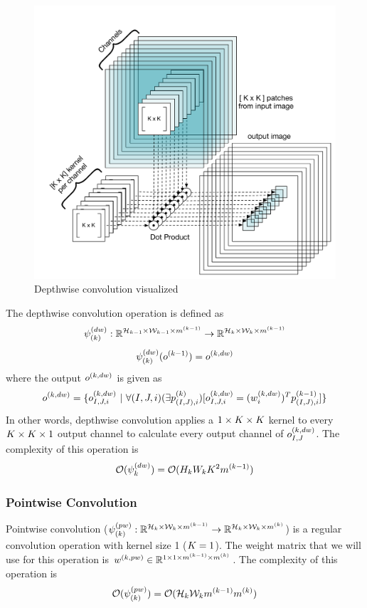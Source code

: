 \begin{figure}[!h]
\vspace{-30px}
  \includegraphics[width=1\textwidth]{images/depthwise.pdf}
  \caption{Depthwise convolution visualized}
  \label{fig:depthwise_conv}
\end{figure}

The depthwise convolution operation is defined as
$$ \psi_{(k)}^{(dw)} : \mathbb{R}^{\mathcal{H}_{k-1} \times \mathcal{W}_{k-1} \times m^{(k-1)}} \rightarrow \mathbb{R}^{\mathcal{H}_{k} \times \mathcal{W}_{k} \times m^{(k-1)}} $$ 
$$\psi_{(k)}^{(dw)}(o^{(k-1)}) = o^{(k, dw)} $$
where the output $o^{(k, dw)}$ is given as
$$ \ok{k, dw} = \{ \oki{k, dw}{I,J,i} \ | \ \forall (I,J,i) (\exists \pki{k}{(I,J),i}) [\oki{k, dw}{I,J,i} = (\wki{k, dw}{i})^T \pki{k-1}{(I,J),i}  ] \} $$  %
In other words, depthwise convolution applies a $1 \times K \times K$ kernel to every $K \times K \times 1$ output channel to calculate every output channel of $o^{(k,dw)}_{I,J}$. The complexity of this operation is
$$ \mathcal{O} (\psi_k^{(dw)}) = \mathcal{O} (H_kW_kK^2m^{(k-1)}) $$




\subsubsection{Pointwise Convolution}
Pointwise convolution ($\psi_{(k)}^{(pw)} : \mathbb{R}^{\mathcal{H}_{k} \times \mathcal{W}_{k} \times m^{(k-1)}} \rightarrow \mathbb{R}^{\mathcal{H}_{k} \times \mathcal{W}_{k} \times m^{(k)}}$) is a regular convolution operation with kernel size 1 ($K = 1$). The weight matrix that we will use for this operation is $w^{(k, pw)} \in \mathbb{R}^{ 1 \times 1 \times m^{(k-1)} \times m^{(k)}}$. The complexity of this operation is
$$ \mathcal{O}(\psi_{(k)}^{(pw)}) = \mathcal{O}( \mathcal{H}_{k}\mathcal{W}_{k}m^{(k-1)}m^{(k)})$$

